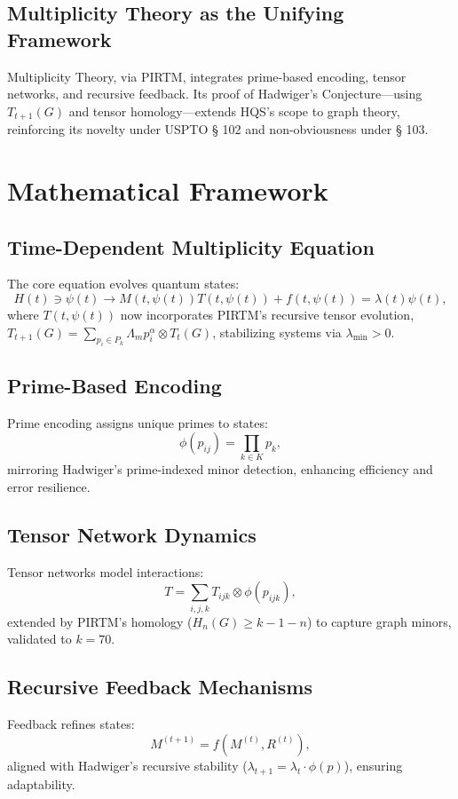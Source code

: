 \documentclass[12pt]{article}
\begin{document}
\subsection{Multiplicity Theory as the Unifying Framework}
Multiplicity Theory, via PIRTM, integrates prime-based encoding, tensor networks, and recursive feedback. Its proof of Hadwiger’s Conjecture—using \( T_{t+1}(G) \) and tensor homology—extends HQS’s scope to graph theory, reinforcing its novelty under USPTO § 102 and non-obviousness under § 103.

\section{Mathematical Framework}
\subsection{Time-Dependent Multiplicity Equation}
The core equation evolves quantum states:
\[
H(t) \ni \psi(t) \rightarrow M(t, \psi(t)) T(t, \psi(t)) + f(t, \psi(t)) = \lambda(t) \psi(t),
\]
where \( T(t, \psi(t)) \) now incorporates PIRTM’s recursive tensor evolution, \( T_{t+1}(G) = \sum_{p_i \in P_k} \Lambda_m p_i^\alpha \otimes T_t(G) \), stabilizing systems via \( \lambda_{\min} > 0 \).

\subsection{Prime-Based Encoding}
Prime encoding assigns unique primes to states:
\[
\phi(p_{ij}) = \prod_{k \in K} p_k,
\]
mirroring Hadwiger’s prime-indexed minor detection, enhancing efficiency and error resilience.

\subsection{Tensor Network Dynamics}
Tensor networks model interactions:
\[
T = \sum_{i,j,k} T_{ijk} \otimes \phi(p_{ijk}),
\]
extended by PIRTM’s homology (\( H_n(G) \geq k-1-n \)) to capture graph minors, validated to $k=70$.

\subsection{Recursive Feedback Mechanisms}
Feedback refines states:
\[
M^{(t+1)} = f(M^{(t)}, R^{(t)}),
\]
aligned with Hadwiger’s recursive stability (\( \lambda_{t+1} = \lambda_t \cdot \phi(p) \)), ensuring adaptability.
\end{document}
